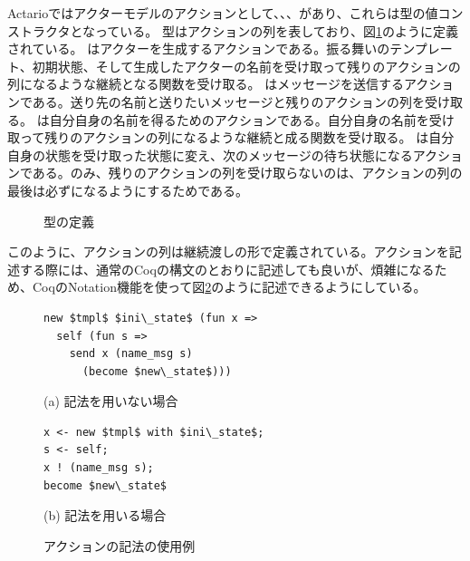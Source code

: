 Actarioではアクターモデルのアクションとして、、、があり、これらは型の値コンストラクタとなっている。
型はアクションの列を表しており、図\ref{code:overview:actions}のように定義されている。
はアクターを生成するアクションである。振る舞いのテンプレート、初期状態、そして生成したアクターの名前を受け取って残りのアクションの列になるような継続となる関数を受け取る。
はメッセージを送信するアクションである。送り先の名前と送りたいメッセージと残りのアクションの列を受け取る。
は自分自身の名前を得るためのアクションである。自分自身の名前を受け取って残りのアクションの列になるような継続と成る関数を受け取る。
は自分自身の状態を受け取った状態に変え、次のメッセージの待ち状態になるアクションである。のみ、残りのアクションの列を受け取らないのは、アクションの列の最後は必ずになるようにするためである。

\begin{figure}
  
  \label{code:overview:actions}
  \caption{型の定義}
\end{figure}

このように、アクションの列は継続渡しの形で定義されている。アクションを記述する際には、通常のCoqの構文のとおりに記述しても良いが、煩雑になるため、CoqのNotation機能を使って図\ref{code:overview:notation}のように記述できるようにしている。

\begin{figure}\centering
\begin{minipage}{0.42\textwidth}\centering
\begin{lstlisting}[frame=single,numbers=none,xleftmargin=0pt]
new $tmpl$ $ini\_state$ (fun x =>
  self (fun s =>
    send x (name_msg s)
      (become $new\_state$)))
\end{lstlisting}
(a) 記法を用いない場合
\end{minipage}
\hspace*{3ex}
\begin{minipage}{0.42\textwidth}\centering
\begin{lstlisting}[frame=single,numbers=none,xleftmargin=0pt]
x <- new $tmpl$ with $ini\_state$;
s <- self;
x ! (name_msg s);
become $new\_state$
\end{lstlisting}
(b) 記法を用いる場合
\end{minipage}
\caption{アクションの記法の使用例}\label{code:overview:notation}
\end{figure}


